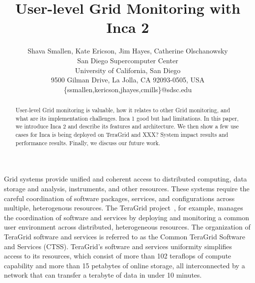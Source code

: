 \documentclass[times, 10pt,twocolumn]{article}
\begin{document}
\title{User-level Grid Monitoring with Inca 2}

\author{Shava Smallen, Kate Ericson, Jim Hayes, Catherine Olschanowsky \\
San Diego Supercomputer Center\\ University of California, San Diego\\ 
9500 Gilman Drive, La Jolla, CA 92093-0505, USA\\ 
\{ssmallen,kericson,jhayes,cmills\}@sdsc.edu\\
}

\maketitle
\thispagestyle{empty}


\begin{abstract}
User-level Grid monitoring is valuable, how it relates to other Grid
monitoring,  and what are its implementation challenges.
Inca 1 good but had limitations.  In this paper, we introduce Inca 2 and
describe its features and architecture.  We then show a few use cases for Inca
is being deployed on TeraGrid and XXX?  System impact results and performance
results.  Finally, we discuss our future work.  
\end{abstract}


Grid systems provide unified and coherent access to distributed computing,
data storage and analysis, instruments, and other resources.  These systems
require the careful coordination of software packages, services, and
configurations across multiple, heterogenous resources.  The TeraGrid
project~\cite{teragrid}, for example, manages the coordination of software and
services by deploying and monitoring a common user environment across
distributed, heterogeneous resources. The organization of TeraGrid software
and services is referred to as the Common TeraGrid Software and Services
(CTSS).  TeraGrid's software and services uniformity simplifies access to its
resources, which consist of more than 102 teraflops of compute capability and
more than 15 petabytes of online storage, all interconnected by a network that
can transfer a terabyte of data in under 10 minutes.  
\end{document}
